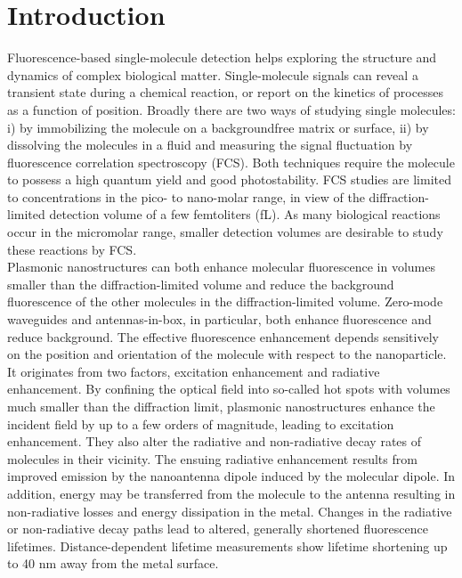 \documentclass[journal=jpccck,manuscript=article]{achemso}
\begin{document}
\section{Introduction}
Fluorescence-based single-molecule detection helps exploring the structure and dynamics of complex biological matter.\cite{moerner1999illuminating,weiss1999fluorescence} Single-molecule signals can reveal a transient state during a chemical reaction, or report on the kinetics of processes as a function of position. Broadly there are two ways of studying single molecules: i) by immobilizing the molecule on a backgroundfree matrix or surface, ii) by dissolving the molecules in a fluid and measuring the signal fluctuation by fluorescence correlation spectroscopy (FCS).\cite{Magde1972} Both techniques require the molecule to possess a high quantum yield and good photostability. FCS studies are limited to concentrations in the pico- to nano-molar range, in view of the diffraction-limited detection volume of a few femtoliters (fL). As many biological reactions occur in the micromolar range\cite{craighead2006future}, smaller detection volumes are desirable to study these reactions by FCS.\\

Plasmonic nanostructures can both enhance molecular fluorescence in volumes smaller than the diffraction-limited volume and reduce the background fluorescence of the other molecules in the diffraction-limited volume. Zero-mode waveguides and antennas-in-box, in particular, both enhance fluorescence and reduce background.\cite{levene2003zeromode,kinkhabwala2012fluorescence,punj2013a,yuan2013thousandfold,punj2013gold} The effective fluorescence enhancement depends sensitively on the position and orientation of the molecule with respect to the nanoparticle. It originates from two factors, excitation enhancement and radiative enhancement. By confining the optical field into so-called hot spots with volumes much smaller than the diffraction limit,\cite{schuller2010plasmonics} plasmonic nanostructures enhance the incident field by up to a few orders of magnitude, leading to excitation enhancement.\cite{yuan2013thousandfold,anger2006enhancement,kinkhabwala2009large,acuna2012fluorescence,busson2012accelerated,holzmeister2014quantum,khatua2014resonant} They also alter the radiative and non-radiative decay rates of molecules in their vicinity. The ensuing radiative enhancement results from improved emission by the nanoantenna dipole induced by the molecular dipole. In addition, energy may be transferred from the molecule to the antenna resulting in non-radiative losses and energy dissipation in the metal. Changes in the radiative or non-radiative decay paths lead to altered, generally shortened fluorescence lifetimes.\cite{khatua2014resonant,liu2007quantized,lakowicz2001radiative,dulkeith2005gold,seelig2007nanoparticleinduced,muskens2007strong,pelton2015modified} Distance-dependent lifetime measurements show lifetime shortening up to 40 nm away from the metal surface.\cite{seelig2007nanoparticleinduced}\\
\end{document}
